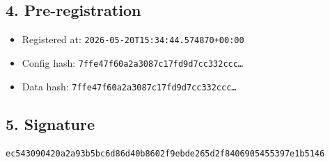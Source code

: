 \documentclass{article}
\begin{document}
\subsection*{4. Pre-registration}
\begin{itemize}
\item Registered at: \texttt{2026-05-20T15:34:44.574870+00:00}
\item Config hash: \texttt{7ffe47f60a2a3087c17fd9d7cc332ccc\dots}
\item Data hash: \texttt{7ffe47f60a2a3087c17fd9d7cc332ccc\dots}
\end{itemize}
\subsection*{5. Signature}
\texttt{ec543090420a2a93b5bc6d86d40b8602f9ebde265d2f8406905455397e1b5146}\\
\end{document}
